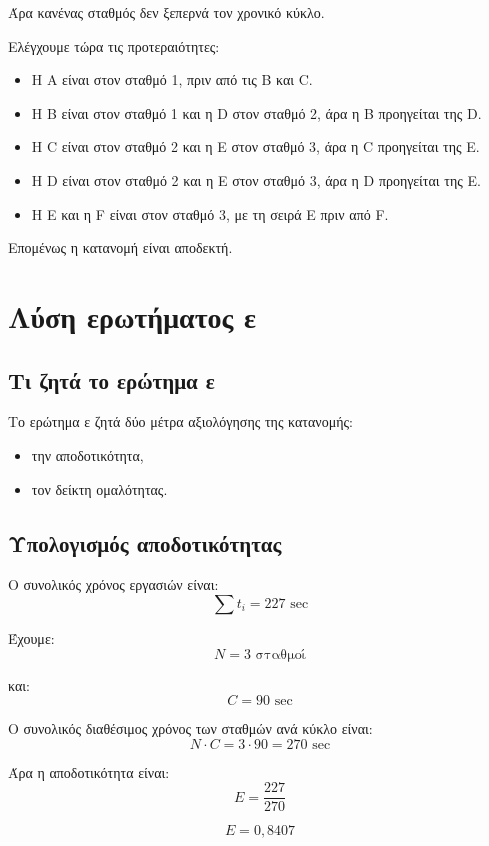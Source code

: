 \documentclass[12pt,a4paper]{article}
\begin{document}
Άρα κανένας σταθμός δεν ξεπερνά τον χρονικό κύκλο.

Ελέγχουμε τώρα τις προτεραιότητες:

\begin{itemize}
    \item Η A είναι στον σταθμό 1, πριν από τις B και C.
    \item Η B είναι στον σταθμό 1 και η D στον σταθμό 2, άρα η B προηγείται της D.
    \item Η C είναι στον σταθμό 2 και η E στον σταθμό 3, άρα η C προηγείται της E.
    \item Η D είναι στον σταθμό 2 και η E στον σταθμό 3, άρα η D προηγείται της E.
    \item Η E και η F είναι στον σταθμό 3, με τη σειρά E πριν από F.
\end{itemize}

Επομένως η κατανομή είναι αποδεκτή.

\section{Λύση ερωτήματος ε}

\subsection{Τι ζητά το ερώτημα ε}

Το ερώτημα ε ζητά δύο μέτρα αξιολόγησης της κατανομής:

\begin{itemize}
    \item την αποδοτικότητα,
    \item τον δείκτη ομαλότητας.
\end{itemize}

\subsection{Υπολογισμός αποδοτικότητας}

Ο συνολικός χρόνος εργασιών είναι:
\[
\sum t_i=227 \text{ sec}
\]

Έχουμε:
\[
N=3 \text{ σταθμοί}
\]

και:
\[
C=90 \text{ sec}
\]

Ο συνολικός διαθέσιμος χρόνος των σταθμών ανά κύκλο είναι:
\[
N\cdot C=3\cdot90=270 \text{ sec}
\]

Άρα η αποδοτικότητα είναι:
\[
E=\frac{227}{270}
\]

\[
E=0{,}8407
\]
\end{document}
